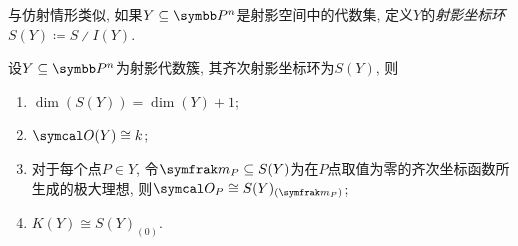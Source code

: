 与仿射情形类似, 如果$Y\subseteq \PP^n$是射影空间中的代数集, 定义$Y$的\emph{射影坐标环}$S(Y)\coloneq S{\divslash}I(Y)$.

\begin{theorem}\label{thm:projectiverings}
  设$Y\subseteq\PP^n$为射影代数簇, 其齐次射影坐标环为$S(Y)$, 则
  \begin{enumerate}
    \item\label{enum:thm-projective-rings-1} $\dim (S(Y))=\dim (Y)+1$;
    \item\label{enum:thm-projective-rings-2} $\OO (Y)\cong\kk$;
    \item\label{enum:thm-projective-rings-3} 对于每个点$P\in Y$, 令$\ideal{m}_P\subseteq S(Y)$为在$P$点取值为零的齐次坐标函数所生成的极大理想, 则$\OO_P\cong S(Y)_{(\ideal{m}_P)}$;
    \item\label{enum:thm-projective-rings-4} $K(Y)\cong S(Y)_{(0)}$.
  \end{enumerate}
\end{theorem}

